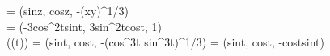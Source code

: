  = (sinz, cosz, -(xy)^{1/3})\\
 = (-3cos^2tsint, 3sin^2tcost, 1)\\
(\gamma(t)) = (sint, cost, -(cos^3t sin^3t)^{1/3}) = (sint, cost, -costsint)